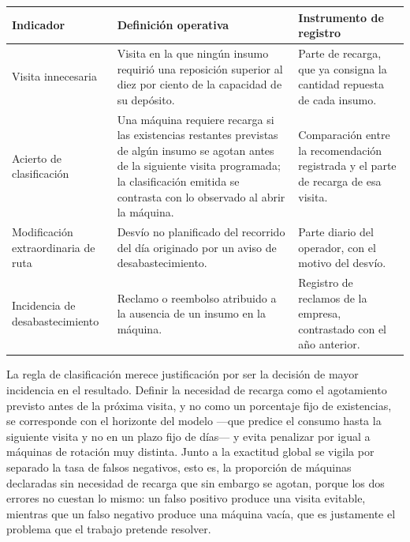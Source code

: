 {\small\setlength{\tabcolsep}{4pt}
\begin{longtable}[]{@{}
  >{\raggedright\arraybackslash}p{}
  >{\raggedright\arraybackslash}p{}
  >{\raggedright\arraybackslash}p{}@{}}
\toprule\noalign{}
\textbf{Indicador} & \textbf{Definición operativa} & \textbf{Instrumento de registro} \\
\midrule\noalign{}
\endhead
\bottomrule\noalign{}
\endlastfoot
Visita innecesaria & Visita en la que ningún insumo requirió una reposición superior al diez por ciento de la capacidad de su depósito. & Parte de recarga, que ya consigna la cantidad repuesta de cada insumo. \\
Acierto de clasificación & Una máquina requiere recarga si las existencias restantes previstas de algún insumo se agotan antes de la siguiente visita programada; la clasificación emitida se contrasta con lo observado al abrir la máquina. & Comparación entre la recomendación registrada y el parte de recarga de esa visita. \\
Modificación extraordinaria de ruta & Desvío no planificado del recorrido del día originado por un aviso de desabastecimiento. & Parte diario del operador, con el motivo del desvío. \\
Incidencia de desabastecimiento & Reclamo o reembolso atribuido a la ausencia de un insumo en la máquina. & Registro de reclamos de la empresa, contrastado con el año anterior. \\
\end{longtable}}


La regla de clasificación merece justificación por ser la decisión de mayor incidencia en el resultado. Definir la necesidad de recarga como el agotamiento previsto antes de la próxima visita, y no como un porcentaje fijo de existencias, se corresponde con el horizonte del modelo —que predice el consumo hasta la siguiente visita y no en un plazo fijo de días— y evita penalizar por igual a máquinas de rotación muy distinta. Junto a la exactitud global se vigila por separado la tasa de falsos negativos, esto es, la proporción de máquinas declaradas sin necesidad de recarga que sin embargo se agotan, porque los dos errores no cuestan lo mismo: un falso positivo produce una visita evitable, mientras que un falso negativo produce una máquina vacía, que es justamente el problema que el trabajo pretende resolver.

